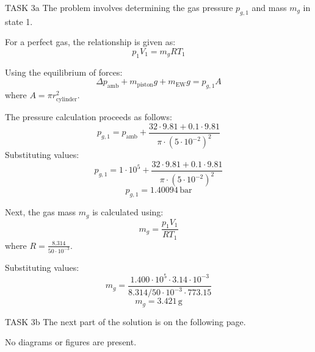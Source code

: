 TASK 3a  
The problem involves determining the gas pressure \( p_{g,1} \) and mass \( m_g \) in state 1.  

For a perfect gas, the relationship is given as:  
\[
p_1 V_1 = m_g R T_1
\]  

Using the equilibrium of forces:  
\[
\Delta p_{\text{amb}} + m_{\text{piston}} g + m_{\text{EW}} g = p_{g,1} A
\]  
where \( A = \pi r_{\text{cylinder}}^2 \).  

The pressure calculation proceeds as follows:  
\[
p_{g,1} = p_{\text{amb}} + \frac{32 \cdot 9.81 + 0.1 \cdot 9.81}{\pi \cdot (5 \cdot 10^{-2})^2}
\]  
Substituting values:  
\[
p_{g,1} = 1 \cdot 10^5 + \frac{32 \cdot 9.81 + 0.1 \cdot 9.81}{\pi \cdot (5 \cdot 10^{-2})^2}
\]  
\[
p_{g,1} = 1.40094 \, \text{bar}
\]  

Next, the gas mass \( m_g \) is calculated using:  
\[
m_g = \frac{p_1 V_1}{R T_1}
\]  
where \( R = \frac{8.314}{50 \cdot 10^{-3}} \).  

Substituting values:  
\[
m_g = \frac{1.400 \cdot 10^5 \cdot 3.14 \cdot 10^{-3}}{8.314 / 50 \cdot 10^{-3} \cdot 773.15}
\]  
\[
m_g = 3.421 \, \text{g}
\]  

TASK 3b  
The next part of the solution is on the following page.  

No diagrams or figures are present.